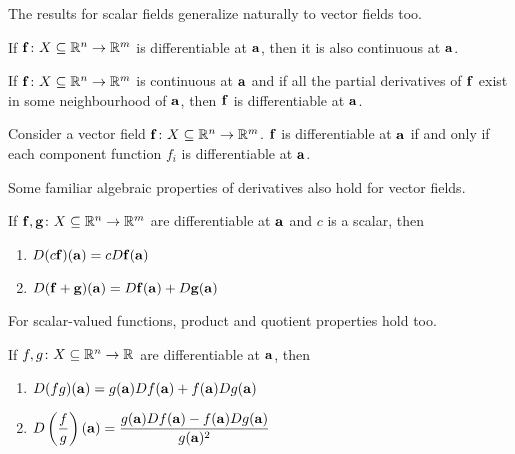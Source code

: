 \documentclass{article}
\begin{document}
The results for scalar fields generalize naturally to vector fields too.

\begin{theorem}
  If $\mathbf{f} \colon X \subseteq \mathbb{R}^n \to \mathbb{R}^m$ is differentiable at $\mathbf{a}$, then it is also continuous at $\mathbf{a}$.
\end{theorem}

\begin{theorem}
  If $\mathbf{f} \colon X \subseteq \mathbb{R}^n \to \mathbb{R}^m$ is continuous at $\mathbf{a}$ and if all the partial derivatives of $\mathbf{f}$ exist in some neighbourhood of $\mathbf{a}$, then $\mathbf{f}$ is differentiable at $\mathbf{a}$.
\end{theorem}

\begin{theorem}
  Consider a vector field $\mathbf{f} \colon X \subseteq \mathbb{R}^n \to \mathbb{R}^m$.
  $\mathbf{f}$ is differentiable at $\mathbf{a}$ if and only if each component function $f_i$ is differentiable at $\mathbf{a}$.
\end{theorem}

Some familiar algebraic properties of derivatives also hold for vector fields.

\begin{theorem}
  If $\mathbf{f}, \mathbf{g} \colon X \subseteq \mathbb{R}^n \to \mathbb{R}^m$ are differentiable at $\mathbf{a}$ and $c$ is a scalar, then
  \begin{enumerate}
    \item $D(c\mathbf{f})(\mathbf{a}) = cD\mathbf{f}(\mathbf{a})$
    \item $D(\mathbf{f} + \mathbf{g})(\mathbf{a}) = D\mathbf{f}(\mathbf{a}) + D\mathbf{g}(\mathbf{a})$
  \end{enumerate}
\end{theorem}

For scalar-valued functions, product and quotient properties hold too.

\begin{theorem}
  If $f, g \colon X \subseteq \mathbb{R}^n \to \mathbb{R}$ are differentiable at $\mathbf{a}$, then
  \begin{enumerate}
    \item $D(fg)(\mathbf{a}) = g(\mathbf{a})Df(\mathbf{a}) + f(\mathbf{a})Dg(\mathbf{a})$
    \item $D\left( \dfrac{f}{g} \right)(\mathbf{a}) = \dfrac{g(\mathbf{a})Df(\mathbf{a}) - f(\mathbf{a})Dg(\mathbf{a})}{g(\mathbf{a})^2}$
  \end{enumerate}
\end{theorem}
\end{document}
